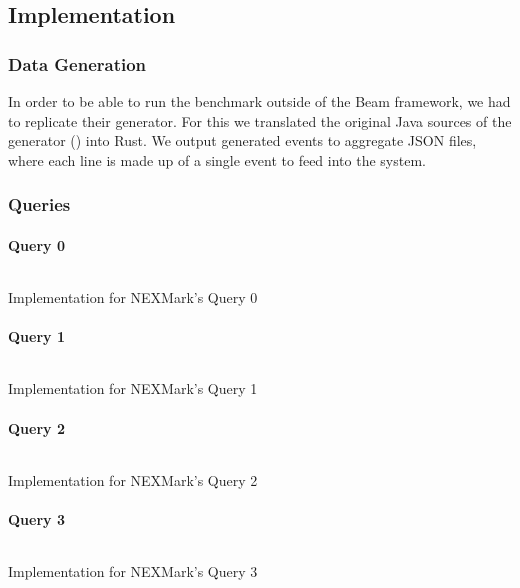 \subsection{Implementation}
\subsubsection{Data Generation}
In order to be able to run the benchmark outside of the Beam framework, we had to replicate their generator. For this we translated the original Java sources of the generator () into Rust. We output generated events to aggregate JSON files, where each line is made up of a single event to feed into the system. \\

\subsubsection{Queries}
\paragraph{Query 0}
\begin{listing}[H]
  \inputminted[firstline=404,lastline=404]{rust}{benchmarks/src/nexmark.rs}
  \caption{Implementation for NEXMark's Query 0}
  \label{lst:nexmark-query0}
\end{listing}

\paragraph{Query 1}
\begin{listing}[H]
  \inputminted[firstline=424,lastline=426]{rust}{benchmarks/src/nexmark.rs}
  \caption{Implementation for NEXMark's Query 1}
  \label{lst:nexmark-query1}
\end{listing}

\paragraph{Query 2}
\begin{listing}[H]
  \inputminted[firstline=447,lastline=450]{rust}{benchmarks/src/nexmark.rs}
  \caption{Implementation for NEXMark's Query 2}
  \label{lst:nexmark-query2}
\end{listing}

\paragraph{Query 3}
\begin{listing}[H]
  \inputminted[firstline=470,lastline=479]{rust}{benchmarks/src/nexmark.rs}
  \caption{Implementation for NEXMark's Query 3}
  \label{lst:nexmark-query3}
\end{listing}

